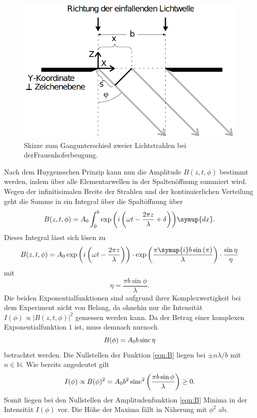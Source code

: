 \begin{figure}[H]
    \centering
    \includegraphics[scale = 0.45]{pictures/frauenhofer2.png}
    \caption{Skizze zum Gangunterschied zweier Lichtstrahlen bei derFrauenhoferbeugung. \cite{AP01}}
    \label{fig:frauenhofer2}
\end{figure}

\noindent
Nach dem Huygensschen Prinzip kann nun die Amplitude $B(z,t,\phi)$ bestimmt werden, indem über alle Elementarwellen 
in der Spaltenöffnung summiert wird. Wegen der infinitisimalen Breite der Strahlen und der kontinuierlichen Verteilung geht die Summe in ein 
Integral über die Spaltöffnung über
\begin{equation*}
    B(z,t,\phi)=A_0\int_0^b{\exp{\left(i\left(\omega t-\frac{2\pi z}{\lambda}+\delta\right)\right)}\symup{dx}}    .
\end{equation*}
Dieses Integral lässt sich lösen zu 
\begin{equation*}
    B(z,t,\phi) = A_0\exp{\left(i\left(\omega t-\frac{2 \pi z}{\lambda}\right)\right)}
                \cdot\exp{\left(\frac{\pi \symup{i} b \sin{(\pi)}}{\lambda}\right)}
                \cdot\frac{\sin{\eta}}{\eta}
\end{equation*}
mit
\begin{equation*}
    \eta=\frac{\pi b \sin{\phi}}{\lambda}   .
\end{equation*}
Die beiden Exponentialfunktionen sind aufgrund ihrer Komplexwertigkeit bei dem Experiment nicht von Belang, da ohnehin nur
die Intensität $I(\phi)\propto |B(z,t,\phi)|^2$ gemessen werden kann. Da der Betrag einer komplexen Exponentialfunktion $\num{1}$ ist, muss 
demnach nurnoch 
\begin{equation}
    B(\phi)=A_0b\operatorname{sinc}{\eta}
    \label{eqn:B}
\end{equation}
betrachtet werden. Die Nullstellen der Funktion \eqref{eqn:B} liegen bei $\pm n\lambda/b$ mit $n \in \mathbb{N}$.
Wie bereits angedeutet gilt 
\begin{equation}
    I(\phi)\propto B(\phi)^2=
    A_0b^2\operatorname{sinc}^2{\left(\frac{\pi b \sin{\phi}}{\lambda}\right)}
    \geq 0  .
    \label{eqn:intensität1}
\end{equation}
Somit liegen bei den Nullstellen der Amplitudenfunktion \ref{eqn:B} Minima in der Intensität $I(\phi)$ vor. Die Höhe der Maxima fällt in 
Näherung mit $\phi^2$ ab.   

